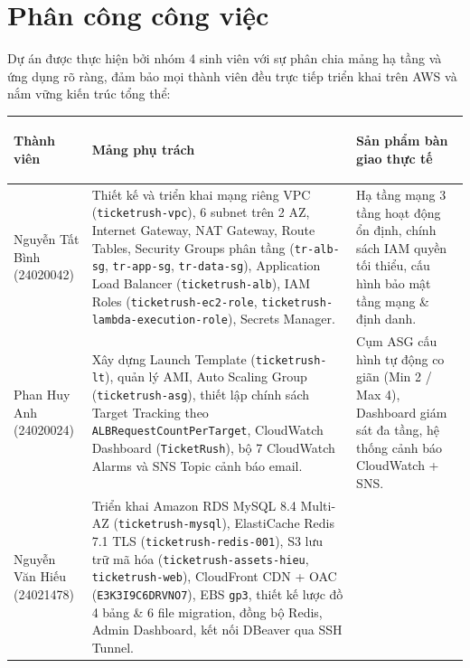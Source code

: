 \clearpage

\chapter*{Phân công công việc}

Dự án được thực hiện bởi nhóm 4 sinh viên với sự phân chia mảng hạ tầng và ứng dụng rõ ràng, đảm bảo mọi thành viên đều trực tiếp triển khai trên AWS và nắm vững kiến trúc tổng thể:

\begin{table}[H]
  \centering
  \footnotesize
  \renewcommand{\arraystretch}{1.18}
  \begin{tabularx}{\textwidth}{>{\bfseries\raggedright\arraybackslash}p{2.7cm} >{\raggedright\arraybackslash}X >{\raggedright\arraybackslash}p{3.9cm}}
    \toprule
    Thành viên & Mảng phụ trách & Sản phẩm bàn giao thực tế \\
    \midrule
    Nguyễn Tất Bình \newline (24020042) &
      Thiết kế và triển khai mạng riêng VPC (\texttt{ticketrush-vpc}), 6 subnet trên 2 AZ, Internet Gateway, NAT Gateway, Route Tables, Security Groups phân tầng (\texttt{tr-alb-sg}, \texttt{tr-app-sg}, \texttt{tr-data-sg}), Application Load Balancer (\texttt{ticketrush-alb}), IAM Roles (\texttt{ticketrush-ec2-role}, \texttt{ticketrush-lambda-execution-role}), Secrets Manager. &
      Hạ tầng mạng 3 tầng hoạt động ổn định, chính sách IAM quyền tối thiểu, cấu hình bảo mật tầng mạng \& định danh. \\
    \midrule
    Phan Huy Anh \newline (24020024) &
      Xây dựng Launch Template (\texttt{ticketrush-lt}), quản lý AMI, Auto Scaling Group (\texttt{ticketrush-asg}), thiết lập chính sách Target Tracking theo \texttt{ALBRequestCountPerTarget}, CloudWatch Dashboard (\texttt{TicketRush}), bộ 7 CloudWatch Alarms và SNS Topic cảnh báo email. &
      Cụm ASG cấu hình tự động co giãn (Min 2 / Max 4), Dashboard giám sát đa tầng, hệ thống cảnh báo CloudWatch + SNS. \\
    \midrule
    Nguyễn Văn Hiếu \newline (24021478) &
      Triển khai Amazon RDS MySQL 8.4 Multi-AZ (\texttt{ticketrush-mysql}), ElastiCache Redis 7.1 TLS (\texttt{ticketrush-redis-001}), S3 lưu trữ mã hóa (\texttt{ticketrush-assets-hieu}, \texttt{ticketrush-web}), CloudFront CDN + OAC (\texttt{E3K3I9C6DRVNO7}), EBS \texttt{gp3}, thiết kế lược đồ 4 bảng \& 6 file migration, đồng bộ Redis, Admin Dashboard, kết nối DBeaver qua SSH Tunnel. &

\end{tabularx}
\end{table}
